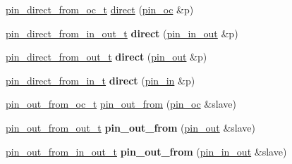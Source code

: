 \begin{DoxyCompactItemize}
\item 
\hyperlink{classhwlib_1_1pin__direct__from__oc__t}{pin\+\_\+direct\+\_\+from\+\_\+oc\+\_\+t} \hyperlink{namespacehwlib_a43941b7f246ad934ee43dbfa0f5c8b5a}{direct} (\hyperlink{classhwlib_1_1pin__oc}{pin\+\_\+oc} \&p)
\item 
\mbox{\label{namespacehwlib_abeb61fe3ef1cbfca9053a3fa340ef6d1}} 
\hyperlink{classhwlib_1_1pin__direct__from__in__out__t}{pin\+\_\+direct\+\_\+from\+\_\+in\+\_\+out\+\_\+t} {\bfseries direct} (\hyperlink{classhwlib_1_1pin__in__out}{pin\+\_\+in\+\_\+out} \&p)
\item 
\mbox{\label{namespacehwlib_a5748fc71cf5509f49519ddda36994264}} 
\hyperlink{classhwlib_1_1pin__direct__from__out__t}{pin\+\_\+direct\+\_\+from\+\_\+out\+\_\+t} {\bfseries direct} (\hyperlink{classhwlib_1_1pin__out}{pin\+\_\+out} \&p)
\item 
\mbox{\label{namespacehwlib_afdb0cfbcc387b60d369a2ac4264c29e9}} 
\hyperlink{classhwlib_1_1pin__direct__from__in__t}{pin\+\_\+direct\+\_\+from\+\_\+in\+\_\+t} {\bfseries direct} (\hyperlink{classhwlib_1_1pin__in}{pin\+\_\+in} \&p)
\end{DoxyCompactItemize}

\textbf{ }\par
\begin{DoxyCompactItemize}
\item 
\hyperlink{classhwlib_1_1pin__out__from__oc__t}{pin\+\_\+out\+\_\+from\+\_\+oc\+\_\+t} \hyperlink{namespacehwlib_aa1e6aac16c5ac14715e165b463ec6a46}{pin\+\_\+out\+\_\+from} (\hyperlink{classhwlib_1_1pin__oc}{pin\+\_\+oc} \&slave)
\item 
\mbox{\label{namespacehwlib_a3ce4337cbc4610752785a8766a72dde4}} 
\hyperlink{classhwlib_1_1pin__out__from__out__t}{pin\+\_\+out\+\_\+from\+\_\+out\+\_\+t} {\bfseries pin\+\_\+out\+\_\+from} (\hyperlink{classhwlib_1_1pin__out}{pin\+\_\+out} \&slave)
\item 
\mbox{\label{namespacehwlib_ae26ee7675d8c8a2b220365498c66f6d1}} 
\hyperlink{classhwlib_1_1pin__out__from__in__out__t}{pin\+\_\+out\+\_\+from\+\_\+in\+\_\+out\+\_\+t} {\bfseries pin\+\_\+out\+\_\+from} (\hyperlink{classhwlib_1_1pin__in__out}{pin\+\_\+in\+\_\+out} \&slave)
\end{DoxyCompactItemize}

